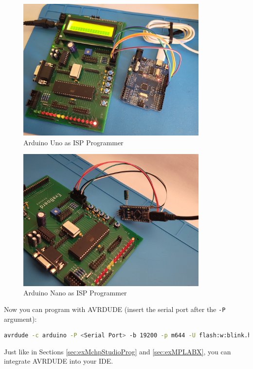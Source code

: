\documentclass{article}
\begin{document}
\begin{figure}[htb]
\centering
\includegraphics[width=0.85\textwidth]{Pictures/ArduinoUnoProg.jpg}
\caption{Arduino Uno as ISP Programmer}
\label{fig:arduinoUnoProg}
\end{figure}
\begin{figure}[htb]
\centering
\includegraphics[width=0.85\textwidth]{Pictures/ArduinoNanoProg.jpg}
\caption{Arduino Nano as ISP Programmer}
\label{fig:arduinoNanoProg}
\end{figure}

Now you can program with AVRDUDE (insert the serial port after the \texttt{-P} argument):
\begin{lstlisting}[language=bash]
avrdude -c arduino -P <Serial Port> -b 19200 -p m644 -U flash:w:blink.hex:i
\end{lstlisting}

Just like in Sections \ref{sec:exMchpStudioProg} and \ref{sec:exMPLABX}, you can integrate AVRDUDE into your IDE. 
\FloatBarrier
\end{document}

